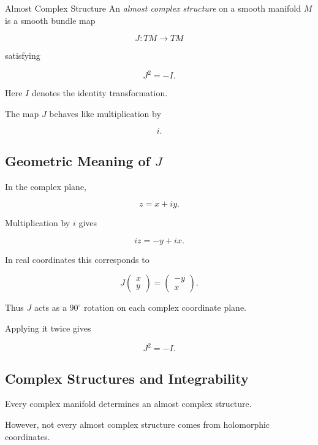 \begin{definitionbox}{Almost Complex Structure}
An \emph{almost complex structure} on a smooth manifold \(M\) is a smooth
bundle map

\[
\boxed{
J:TM\to TM
}
\]

satisfying

\[
\boxed{
J^2=-I.
}
\]
\end{definitionbox}

Here \(I\) denotes the identity transformation.

The map \(J\) behaves like multiplication by

\[
i.
\]

\subsection{Geometric Meaning of \(J\)}
\label{subsec:geometric-meaning-j}

In the complex plane,

\[
z=x+iy.
\]

Multiplication by \(i\) gives

\[
iz=-y+ix.
\]

In real coordinates this corresponds to

\[
\boxed{
J
\begin{pmatrix}
x\\y
\end{pmatrix}
=
\begin{pmatrix}
-y\\x
\end{pmatrix}.
}
\]

Thus \(J\) acts as a \(90^\circ\) rotation on each complex coordinate plane.

Applying it twice gives

\[
J^2=-I.
\]

\subsection{Complex Structures and Integrability}
\label{subsec:complex-integrability}

Every complex manifold determines an almost complex structure.

However, not every almost complex structure comes from holomorphic
coordinates.

